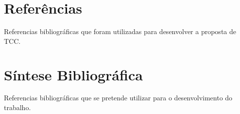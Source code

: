 \documentclass[
	12pt,				%
	a4paper,			%
	english,			%
	brazil,				%
	]{article}
\begin{document}
\section{Referências}

Referencias bibliográficas que foram utilizadas para desenvolver a proposta de TCC.
    \vspace{-4.3em}
    \renewcommand\refname{}
    
    
    
\section{Síntese Bibliográfica}

Referencias bibliográficas que se pretende utilizar para o desenvolvimento do trabalho.


\end{document}
